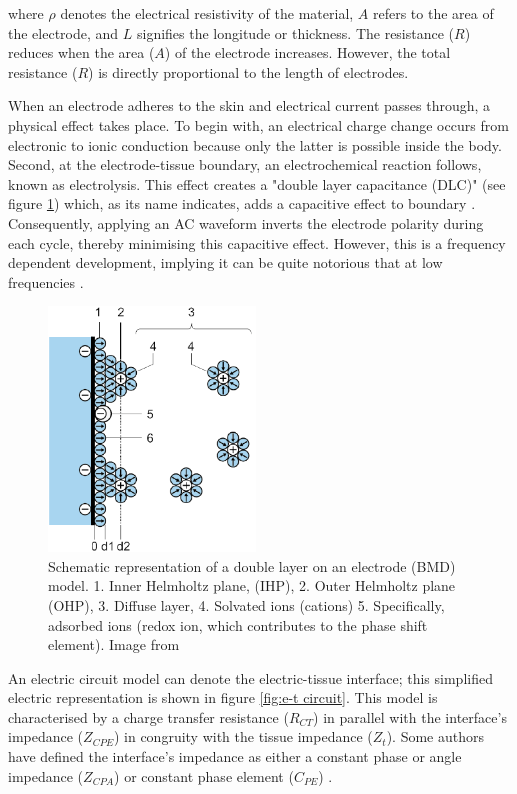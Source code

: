 where $\rho$ denotes the electrical resistivity of the material, $A$ refers to the area of the electrode, and $L$ signifies the longitude or thickness. The resistance ($R$) reduces when the area ($A$) of the electrode increases. However, the total resistance ($R$) is directly proportional to the length of electrodes. 

When an electrode adheres to the skin and electrical current passes through, a physical effect takes place. To begin with, an electrical charge change occurs from electronic to ionic conduction because only the latter is possible inside the body. Second, at the electrode-tissue boundary, an electrochemical reaction follows, known as electrolysis. This effect creates a "double layer capacitance (DLC)" (see figure \ref{fig:DLC}) which, as its name indicates, adds a capacitive effect to boundary \cite{lvovich2012impedance}. Consequently, applying an AC waveform inverts the electrode polarity during each cycle, thereby minimising this capacitive effect. However, this is a frequency dependent development, implying it can be quite notorious that at low frequencies \cite{bertemes2002tissue}.  

\begin{figure}[!htpb]
	\centering
	\includegraphics[width=5.5cm,keepaspectratio]{figure7}    
	\caption[Dual layer representation on an electrode]{Schematic representation of a double layer on an electrode (BMD) model. 1. Inner Helmholtz plane, (IHP), 2. Outer Helmholtz plane (OHP), 3. Diffuse layer, 4. Solvated ions (cations) 5. Specifically, adsorbed ions (redox ion, which contributes to the phase shift element). Image from \cite{lvovich2012impedance}}
	\label{fig:DLC}
\end{figure}

An electric circuit model can denote the electric-tissue interface; this simplified electric representation is shown in figure \ref{fig:e-t circuit}. This model is characterised by a charge transfer resistance ($R_{CT}$) in parallel with the interface's impedance ($Z_{CPE}$) in congruity with the tissue impedance ($Z_t$).  Some authors have defined the interface's impedance as either a constant phase or angle impedance ($Z_{CPA}$) \cite{franks2005impedance} or constant phase element ($C_{PE}$) \cite{barsoukov2005impedance, mcadams2006characterization}. 

